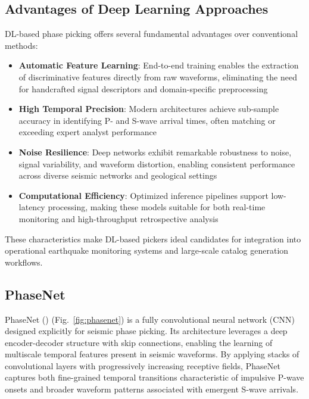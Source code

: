 \subsection{Advantages of Deep Learning Approaches}
\ac{DL}-based phase picking offers several fundamental advantages over
conventional methods:
\begin{itemize}
  \item \textbf{Automatic Feature Learning}: End-to-end training enables
    the extraction of discriminative features directly from raw waveforms,
    eliminating the need for handcrafted signal descriptors and domain-specific
    preprocessing

  \item \textbf{High Temporal Precision}: Modern architectures achieve
    sub-sample accuracy in identifying P- and S-wave arrival times, often
    matching or exceeding expert analyst performance

  \item \textbf{Noise Resilience}: Deep networks exhibit remarkable
    robustness to noise, signal variability, and waveform distortion, enabling
    consistent performance across diverse seismic networks and geological
    settings

  \item \textbf{Computational Efficiency}: Optimized inference pipelines
    support low-latency processing, making these models suitable for both
    real-time monitoring and high-throughput retrospective analysis
\end{itemize}

These characteristics make \ac{DL}-based pickers ideal candidates for
integration into operational earthquake monitoring systems and large-scale
catalog generation workflows.

\subsection{PhaseNet}

PhaseNet (\cite{PhaseNet}) (Fig.~\ref{fig:phasenet}) is a fully
convolutional neural network (CNN)
designed explicitly for seismic phase picking. Its architecture leverages a
deep encoder-decoder structure with skip connections, enabling the learning of
multiscale temporal features present in seismic waveforms. By applying stacks
of convolutional layers with progressively increasing receptive fields,
PhaseNet captures both fine-grained temporal transitions characteristic of
impulsive P-wave onsets and broader waveform patterns associated with emergent
S-wave arrivals.

